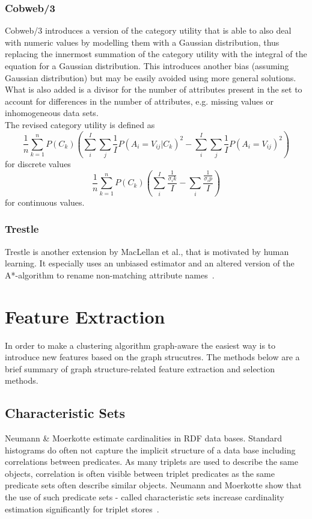 \subsubsection{Cobweb/3}\label{\positionnumber}
Cobweb/3 introduces a version of the category utility that is able to also deal with numeric values by modelling them with a Gaussian distribution, thus replacing the innermost summation of the category utility with the integral of the equation for a Gaussian distribution. This introduces another bias (assuming Gaussian distribution) but may be easily avoided using more general solutions. What is also added is a divisor for the number of attributes present in the set to account for differences in the number of attributes, e.g. missing values or inhomogeneous data sets. \\
The revised category utility is defined as   \[ \frac{1}{n} \sum_{k = 1}^n P(C_k) ( \sum_i^I \sum_j \frac{1}{I} P(A_i = V_{ij}| C_k)^2 - \sum_i^I \sum_j \frac{1}{I} P(A_i = V_{ij})^2) \] for discrete values 
\[ \frac{1}{n} \sum_{k = 1}^n P(C_k) ( \sum_i^I \frac{\frac{1}{\sigma_ik}}{I} - \sum_i \frac{\frac{1}{\sigma_ip}}{I}) \] 
for continuous values.


\subsubsection{Trestle}\label{\positionnumber}
Trestle is another extension by MacLellan et al., that is motivated by human learning. It especially uses an unbiased estimator and an altered version of the A*-algorithm to rename non-matching attribute names~\cite{maclellan2016trestle}.

\section{Feature Extraction}\label{\positionnumber}
In order to make a clustering algorithm graph-aware the easiest way is to introduce new features based on the graph strucutres. The methods below are a brief summary of graph structure-related feature extraction and selection methods. \\

\subsection{Characteristic Sets}\label{\positionnumber}
Neumann \& Moerkotte estimate cardinalities in RDF data bases. Standard histograms do often not capture the implicit structure of a data base including correlations between predicates. As many triplets are used to describe the same objects, correlation is often visible between triplet predicates as the same predicate sets often describe similar objects. Neumann and Moerkotte show that the use of such predicate sets - called characteristic sets increase cardinality estimation significantly for triplet stores~\cite{neumann2011characteristic}.


